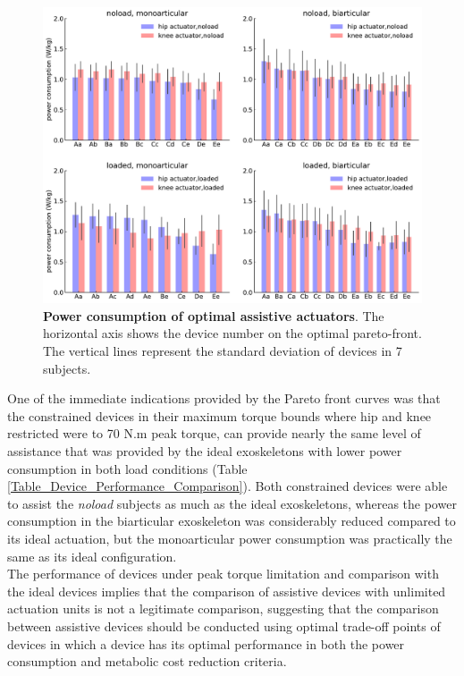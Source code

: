 \documentclass[10pt,letterpaper]{article}
\begin{document}
\begin{figure}[ht]   
	\centering
	\includegraphics[width=\linewidth]{Pareto_Simulations_Figures/PaperFigure_Paretofront_EnergyBarPlot.pdf}
	\vspace{1mm}
	\caption{{\small\textbf{Power consumption of optimal assistive actuators}. The horizontal axis shows the device number on the optimal pareto-front. The vertical lines represent the standard deviation of devices in 7 subjects.}}
	\label{Fig_Paretofronts_Actuators_EnergyBarPlot}
\end{figure}
 One of the immediate indications provided by the Pareto front curves was that the constrained devices in their maximum torque bounds where hip and knee restricted were to 70 N.m peak torque, can provide nearly the same level of assistance that was provided by the ideal exoskeletons with lower power consumption in both load conditions (Table \ref{Table_Device_Performance_Comparison}). Both constrained devices were able to assist the \textit{noload} subjects as much as the ideal exoskeletons, whereas the power consumption in the biarticular exoskeleton was considerably reduced compared to its ideal actuation, but the monoarticular power consumption was practically the same as its ideal configuration.\\
The performance of devices under peak torque limitation and comparison with the ideal devices implies that the comparison of assistive devices with unlimited actuation units is not a legitimate comparison, suggesting that the comparison between assistive devices should be conducted using optimal trade-off points of devices in which a device has its optimal performance in both the power consumption and metabolic cost reduction criteria.\\
\end{document}
